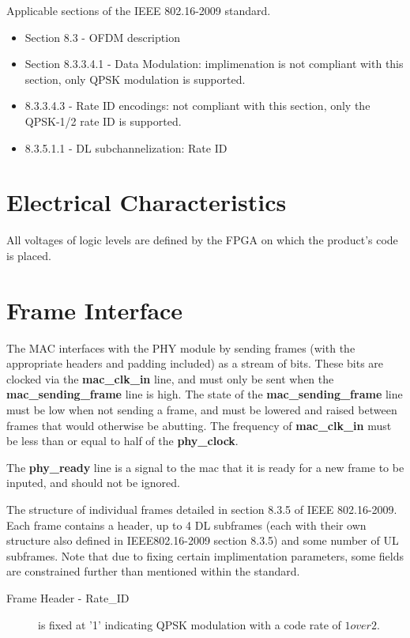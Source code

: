 \documentclass[dvips,10pt,twocolumn]{article}
\begin{document}
	Applicable sections of the IEEE 802.16-2009 standard.
	\begin{itemize}
		\item Section 8.3 - OFDM description
		\item Section 8.3.3.4.1 - Data Modulation: implimenation
			is not compliant with this section, only QPSK
			modulation is supported.
		\item 8.3.3.4.3 - Rate ID encodings: not compliant with
			this section, only the QPSK-1/2 rate ID is supported.
		\item 8.3.5.1.1 - DL subchannelization: Rate ID
	\end{itemize}
\section{Electrical Characteristics}
All voltages of logic levels are defined by the FPGA on which the product's
code is placed.

\section{Frame Interface}
\label{sec:frame}
The MAC interfaces with the PHY module by sending frames (with the
appropriate headers and padding included) as a stream of bits.  These bits
are clocked via the \textbf{mac\_clk\_in} line, and must only be sent when
the \textbf{mac\_sending\_frame} line is high.  The state of the
\textbf{mac\_sending\_frame} line must be low when not sending a frame, and
must be lowered and raised between frames that would otherwise be abutting.
The frequency of \textbf{mac\_clk\_in} must be less than or equal to half
of the \textbf{phy\_clock}.

The \textbf{phy\_ready} line is a signal to the mac that it is ready for a
new frame to be inputed, and should not be ignored.

The structure of individual frames detailed in section 8.3.5 of IEEE
802.16-2009.  Each frame contains a header, up to 4 DL subframes (each with
their own structure also defined in IEEE802.16-2009 section 8.3.5) and some
number of UL subframes.  Note that due to fixing certain implimentation
parameters, some fields are constrained further than mentioned within the
standard.

\begin{description}
	
	\item[Frame Header - Rate\_ID] is fixed at '1' indicating QPSK
		modulation with a code rate of $1 over 2$.
	
	\item[] \end{description}
\end{document}
